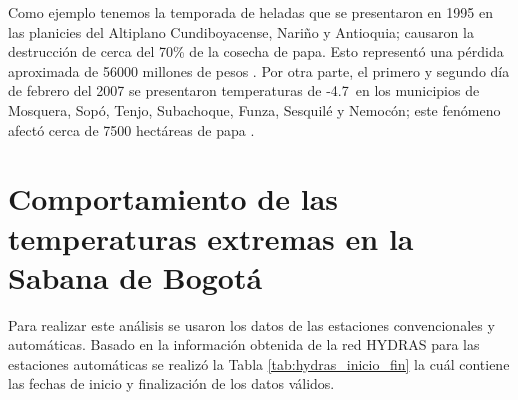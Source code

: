 Como ejemplo tenemos la temporada de heladas que se presentaron en 1995 en las planicies del Altiplano Cundiboyacense,  Nariño y Antioquia; causaron la destrucción de cerca del 70\% de la cosecha de papa. Esto representó una pérdida aproximada de 56000 millones de pesos \citep{Romero1996}. Por otra parte, el primero y segundo día de febrero del 2007 se presentaron temperaturas de -4.7\celc \  en los municipios de Mosquera, Sopó, Tenjo, Subachoque, Funza, Sesquilé y Nemocón; este fenómeno afectó cerca de 7500 hectáreas de papa \citep{ElTiempo2007}.\\







\section{Comportamiento de las temperaturas extremas en la Sabana de Bogotá}

Para realizar este análisis se usaron los datos de las estaciones convencionales y automáticas. Basado en la información obtenida de la red HYDRAS para las estaciones automáticas se realizó la Tabla \ref{tab:hydras_inicio_fin} la cuál contiene las fechas de inicio y finalización de los datos válidos.\\


